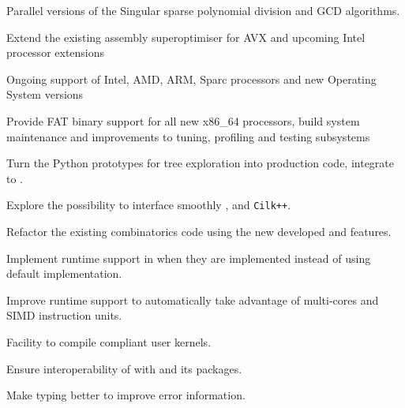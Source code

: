 \begin{workpackage}
\begin{wpdelivs}
\begin{wpdeliv}[due=12,id=singular-polyarith,dissem=PU,nature=DEM]
      {Parallel versions of the Singular sparse polynomial division and GCD algorithms.}
\end{wpdeliv}
  \begin{wpdeliv}[due=12,id=MPIRsuperoptimiser,dissem=PU,nature=DEM]
      {Extend the existing assembly superoptimiser for AVX and upcoming Intel processor extensions}
\end{wpdeliv}
  \begin{wpdeliv}[due=24,id=MPIRprocessors,dissem=PU,nature=DEM]
      {Ongoing support of Intel, AMD, ARM, Sparc processors and new Operating System versions}
\end{wpdeliv}
  \begin{wpdeliv}[due=12,id=MPIRfat,dissem=PU,nature=DEM]
      {Provide FAT binary support for all new x86\_64 processors, build system maintenance and improvements to tuning, profiling and testing subsystems}
\end{wpdeliv}
  \begin{wpdeliv}[due=3,id=HPCcombi,dissem=PU,nature=DEM]
      {Turn the Python prototypes for tree exploration into    production code, integrate to \Sage.}
\end{wpdeliv}
  \begin{wpdeliv}[due=12,id=HPCcombi,dissem=PU,nature=DEM]
      {Explore the possibility to    interface smoothly \Pythran, \Cython and \texttt{Cilk++}.}
\end{wpdeliv}
  \begin{wpdeliv}[due=24,id=HPCcombi,dissem=PU,nature=DEM]
      {Refactor the existing combinatorics \Sage    code using the new developed  \Pythran and \Cython features.}
\end{wpdeliv}
  \begin{wpdeliv}[due=6,id=pythran-cython,dissem=PU,nature=DEM]
      {Implement \Pythran runtime support in \Cython when they are implemented instead of using default implementation.}
\end{wpdeliv}
  \begin{wpdeliv}[due=3,id=pythran-runtime,dissem=PU,nature=DEM]
      {Improve \Pythran runtime support to automatically take advantage of multi-cores and SIMD instruction units.}
\end{wpdeliv}
  \begin{wpdeliv}[due=2,id=pythran-sage,dissem=PU,nature=DEM]
      {Facility to compile \Pythran compliant user kernels.}
\end{wpdeliv}
  \begin{wpdeliv}[due=1,id=pythran,dissem=PU,nature=R]
      {Ensure interoperability of \Pythran with \Python and its packages.}
\end{wpdeliv}
  \begin{wpdeliv}[due=12,id=pythran-typing,dissem=PU,nature=DEM]
      {Make \Pythran typing better to improve error information.}
\end{wpdeliv}
\end{wpdelivs}
\end{workpackage}

